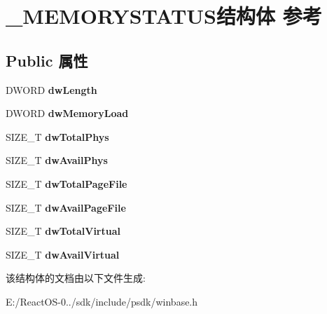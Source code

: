 \hypertarget{struct___m_e_m_o_r_y_s_t_a_t_u_s}{}\section{\+\_\+\+M\+E\+M\+O\+R\+Y\+S\+T\+A\+T\+U\+S结构体 参考}
\label{struct___m_e_m_o_r_y_s_t_a_t_u_s}
\subsection*{Public 属性}
\begin{DoxyCompactItemize}
\item 
\mbox{\label{struct___m_e_m_o_r_y_s_t_a_t_u_s_a57e94358203930e99ca8a2f0d7b90e57}} 
D\+W\+O\+RD {\bfseries dw\+Length}
\item 
\mbox{\label{struct___m_e_m_o_r_y_s_t_a_t_u_s_a5ab491e38fb6b5fc4dc2716fd898c5e2}} 
D\+W\+O\+RD {\bfseries dw\+Memory\+Load}
\item 
\mbox{\label{struct___m_e_m_o_r_y_s_t_a_t_u_s_a00cab19350c8d1f2e87b3c6b4a1ab322}} 
S\+I\+Z\+E\+\_\+T {\bfseries dw\+Total\+Phys}
\item 
\mbox{\label{struct___m_e_m_o_r_y_s_t_a_t_u_s_ac777ccf80c67ca88be0f0b3d87f61674}} 
S\+I\+Z\+E\+\_\+T {\bfseries dw\+Avail\+Phys}
\item 
\mbox{\label{struct___m_e_m_o_r_y_s_t_a_t_u_s_ada965b9a765b8bbe439dd7f865650134}} 
S\+I\+Z\+E\+\_\+T {\bfseries dw\+Total\+Page\+File}
\item 
\mbox{\label{struct___m_e_m_o_r_y_s_t_a_t_u_s_a6606aee0147481fa584e93dfac3fe63e}} 
S\+I\+Z\+E\+\_\+T {\bfseries dw\+Avail\+Page\+File}
\item 
\mbox{\label{struct___m_e_m_o_r_y_s_t_a_t_u_s_afedd7d50cfb1f945546ff15afa6fa531}} 
S\+I\+Z\+E\+\_\+T {\bfseries dw\+Total\+Virtual}
\item 
\mbox{\label{struct___m_e_m_o_r_y_s_t_a_t_u_s_a9aa39d213b1105614e38365151a6f122}} 
S\+I\+Z\+E\+\_\+T {\bfseries dw\+Avail\+Virtual}
\end{DoxyCompactItemize}


该结构体的文档由以下文件生成\+:\begin{DoxyCompactItemize}
\item 
E\+:/\+React\+O\+S-\/0../sdk/include/psdk/winbase.\+h\end{DoxyCompactItemize}
